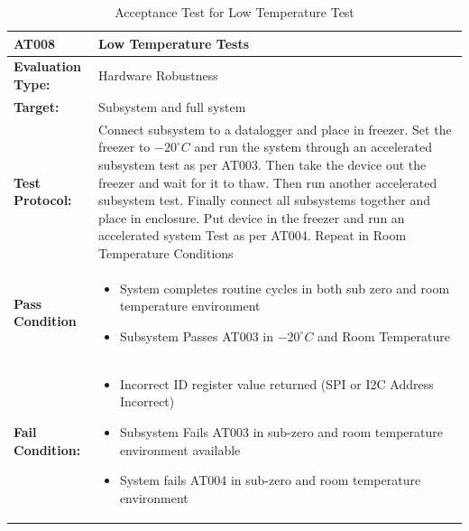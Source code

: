 \begin{table}[H]
	\centering
	\caption{Acceptance Test for Low Temperature Test}
	\begin{tabular}{|m{}|m{}|}
		\hline
		\textbf{AT008 }& \textbf{Low Temperature Tests} \\
		\hline
		\textbf{Evaluation Type:} & Hardware Robustness\\
		\hline
		\textbf{Target: } & Subsystem and full system \\
		\hline
		\textbf{Test Protocol:} & Connect subsystem to a datalogger and place in freezer. Set the freezer to $-20^\circ C$ and run the system through an accelerated subsystem test as per AT003. Then take the device out the freezer and wait for it to thaw. Then run another accelerated subsystem test. Finally connect all subsystems together and place in enclosure. Put device in the freezer and run an accelerated system Test as per AT004. Repeat in Room Temperature Conditions\\
		\hline
		\textbf{Pass Condition} & \vspace{5pt} \begin{itemize}
			\item System completes routine cycles in both sub zero and room temperature environment
			\item Subsystem Passes AT003 in $-20^\circ C$ and Room Temperature
		\end{itemize} \\
		\hline
		\textbf{Fail Condition:} & \vspace{5pt} \begin{itemize}
			\item Incorrect ID register value returned (SPI or I2C Address Incorrect)
			\item Subsystem Fails AT003 in sub-zero and room temperature environment available
			\item System fails AT004 in sub-zero and room temperature environment
		\end{itemize}\\
		\hline
	\end{tabular}
	\label{tab:AT008}
\end{table}

